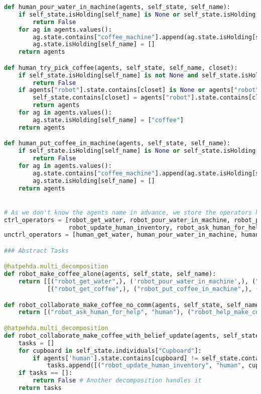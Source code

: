 \begin{lstlisting}[language=Python]
def human_pour_water_in_machine(agents, self_state, self_name):
    if self_state.isHolding[self_name] is None or self_state.isHolding[self_name] == []:
        return False
    for ag in agents.values():
        ag.state.contains["coffee_machine"].append(ag.state.isHolding[self_name][0])
        ag.state.isHolding[self_name] = []
    return agents

def human_try_pick_coffee(agents, self_state, self_name, closet):
    if self_state.isHolding[self_name] is not None and self_state.isHolding[self_name] != []:
        return False
    if agents["robot"].state.contains[closet] is None or agents["robot"].state.contains[closet] == []:
        self_state.contains[closet] = agents["robot"].state.contains[closet]
        return agents
    for ag in agents.values():
        ag.state.isHolding[self_name] = ["coffee"]
    return agents

def human_put_coffee_in_machine(agents, self_state, self_name):
    if self_state.isHolding[self_name] is None or self_state.isHolding[self_name] == []:
        return False
    for ag in agents.values():
        ag.state.contains["coffee_machine"].append(ag.state.isHolding[self_name][0])
        ag.state.isHolding[self_name] = []
    return agents


# As we don't know the agents name in advance, we store the operators here, until a ros plan call
ctrl_operators = [robot_get_water, robot_pour_water_in_machine, robot_pick_coffee, robot_put_coffee_in_machine,
                  robot_update_human_inventory, robot_ask_human_for_help, robot_serve_coffee]
unctrl_operators = [human_get_water, human_pour_water_in_machine, human_try_pick_coffee, human_put_coffee_in_machine]

### Abstract Tasks

@hatpehda.multi_decomposition
def robot_make_coffee_alone(agents, self_state, self_name):
    return [[("robot_get_water",), ('robot_pour_water_in_machine',), ("robot_get_coffee", ), ("robot_put_coffee_in_machine", )],
            [("robot_get_coffee",), ("robot_put_coffee_in_machine",), ("robot_get_water",), ('robot_pour_water_in_machine',)]]

def robot_collaborate_make_coffee_no_comm(agents, self_state, self_name):
    return [("robot_ask_human_for_help", "human"), ("robot_help_make_coffee", "human")]

@hatpehda.multi_decomposition
def robot_collaborate_make_coffee_with_belief_update(agents, self_state, self_name):
    tasks = []
    for cupboard in self_state.individuals["Cupboard"]:
        if agents['human'].state.contains[cupboard] != self_state.contains[cupboard]:
            tasks.append([("robot_update_human_inventory", "human", cupboard), ("robot_ask_human_for_help", "human"), ("robot_help_make_coffee", "human")])
    if tasks == []:
        return False # Another decomposition handles it
    return tasks


\end{lstlisting}
